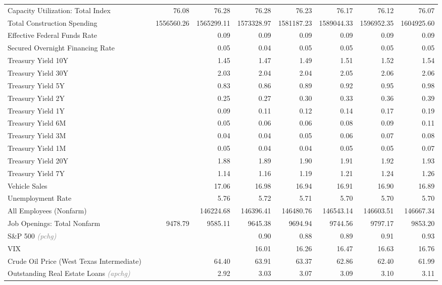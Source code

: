 \documentclass[11pt, letterpaper]{article}\usepackage[]{graphicx}\usepackage[]{color}
\begin{document}
\begin{table}[H]
\begin{tabular}{lrrrrrrrr}
  Capacity Utilization: Total Index &  & 76.08 & 76.28 & 76.28 & 76.23 & 76.17 & 76.12 & 76.07 \\ 
  Total Construction Spending &  & 1556560.26 & 1565299.11 & 1573328.97 & 1581187.23 & 1589044.33 & 1596952.35 & 1604925.60 \\ 
  Effective Federal Funds Rate &  &  & 0.09 & 0.09 & 0.09 & 0.09 & 0.09 & 0.09 \\ 
  Secured Overnight Financing Rate &  &  & 0.05 & 0.04 & 0.05 & 0.05 & 0.05 & 0.05 \\ 
  Treasury Yield 10Y &  &  & 1.45 & 1.47 & 1.49 & 1.51 & 1.52 & 1.54 \\ 
  Treasury Yield 30Y &  &  & 2.03 & 2.04 & 2.04 & 2.05 & 2.06 & 2.06 \\ 
  Treasury Yield 5Y &  &  & 0.83 & 0.86 & 0.89 & 0.92 & 0.95 & 0.98 \\ 
  Treasury Yield 2Y &  &  & 0.25 & 0.27 & 0.30 & 0.33 & 0.36 & 0.39 \\ 
  Treasury Yield 1Y &  &  & 0.09 & 0.11 & 0.12 & 0.14 & 0.17 & 0.19 \\ 
  Treasury Yield 6M &  &  & 0.05 & 0.06 & 0.06 & 0.08 & 0.09 & 0.11 \\ 
  Treasury Yield 3M &  &  & 0.04 & 0.04 & 0.05 & 0.06 & 0.07 & 0.08 \\ 
  Treasury Yield 1M &  &  & 0.05 & 0.04 & 0.04 & 0.05 & 0.05 & 0.07 \\ 
  Treasury Yield 20Y &  &  & 1.88 & 1.89 & 1.90 & 1.91 & 1.92 & 1.93 \\ 
  Treasury Yield 7Y &  &  & 1.14 & 1.16 & 1.19 & 1.21 & 1.24 & 1.26 \\ 
  Vehicle Sales &  &  & 17.06 & 16.98 & 16.94 & 16.91 & 16.90 & 16.89 \\ 
  Unemployment Rate &  &  & 5.76 & 5.72 & 5.71 & 5.70 & 5.70 & 5.70 \\ 
  All Employees (Nonfarm) &  &  & 146224.68 & 146396.41 & 146480.76 & 146543.14 & 146603.51 & 146667.34 \\ 
  Job Openings: Total Nonfarm &  & 9478.79 & 9585.11 & 9645.38 & 9694.94 & 9744.56 & 9797.17 & 9853.20 \\ 
  S\&P 500 \textit{\footnotesize\textcolor{gray}{(pchg)}} &  &  &  & 0.90 & 0.88 & 0.89 & 0.91 & 0.93 \\ 
  VIX &  &  &  & 16.01 & 16.26 & 16.47 & 16.63 & 16.76 \\ 
  Crude Oil Price (West Texas Intermediate) &  &  & 64.40 & 63.91 & 63.37 & 62.86 & 62.40 & 61.99 \\ 
  Outstanding Real Estate Loans \textit{\footnotesize\textcolor{gray}{(apchg)}} &  &  & 2.92 & 3.03 & 3.07 & 3.09 & 3.10 & 3.11 \\ 

\end{tabular}
\end{table}
\end{document}

